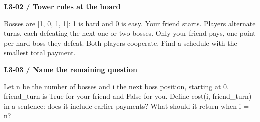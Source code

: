 \documentclass[11pt,a4paper]{article}
\begin{document}
\par\noindent\begin{minipage}{\linewidth}
\textbf{L3-02 / Tower rules at the board}\par\smallskip Bosses are [1, 0, 1, 1]: 1 is hard and 0 is easy. Your friend starts. Players alternate turns, each defeating the next one or two bosses. Only your friend pays, one point per hard boss they defeat. Both players cooperate. Find a schedule with the smallest total payment.\par
\end{minipage}\par\vspace{4mm}
\par\noindent\begin{minipage}{\linewidth}
\textbf{L3-03 / Name the remaining question}\par\smallskip Let n be the number of bosses and i the next boss position, starting at 0. friend\_turn is True for your friend and False for you. Define cost(i, friend\_turn) in a sentence: does it include earlier payments? What should it return when i = n?\par
\end{minipage}\par\vspace{4mm}
\end{document}
